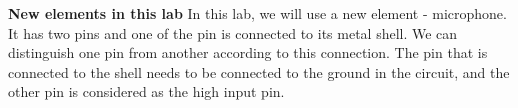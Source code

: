 \vspace{-5pt} \hfill \newline
\textbf{New elements in this lab} \newline
\phantom{ } In this lab, we will use a new element - microphone. It has two pins and one of the pin is connected to its metal shell. We can distinguish one pin from another according to this connection. The pin that is connected to the shell needs to be connected to the ground in the circuit, and the other pin is considered as the high input pin. 